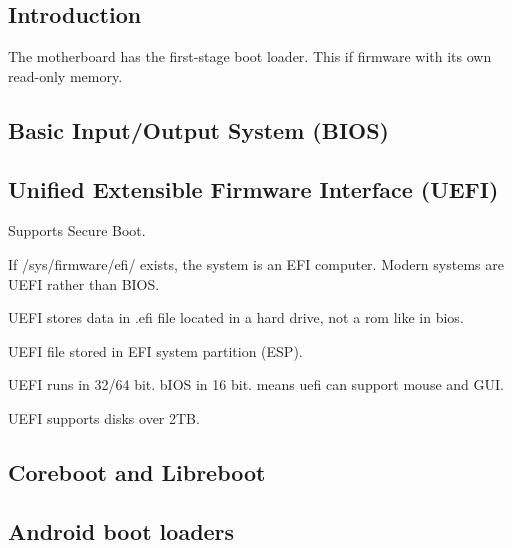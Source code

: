 

\subsection{Introduction}

The motherboard has the first-stage boot loader. This if firmware with its own read-only memory.

\subsection{Basic Input/Output System (BIOS)}

\subsection{Unified Extensible Firmware Interface (UEFI)}

Supports Secure Boot.

If /sys/firmware/efi/ exists, the system is an EFI computer. Modern systems are UEFI rather than BIOS.


UEFI stores data in .efi file located in a hard drive, not a rom like in bios.

UEFI file stored in EFI system partition (ESP).

UEFI  runs in 32/64 bit. bIOS in 16 bit. means uefi can support mouse and GUI.

UEFI  supports disks over 2TB.

\subsection{Coreboot and Libreboot}


\subsection{Android boot loaders}

